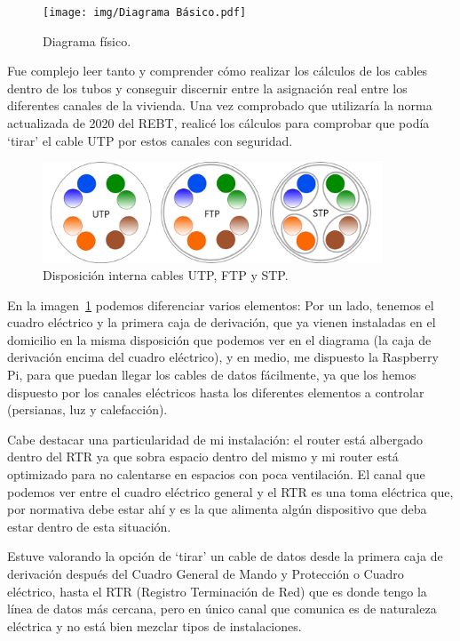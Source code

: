 \begin{figure}[h]
    \centering
    \texttt{[image: img/Diagrama Básico.pdf]}
    \caption{Diagrama físico. } \label{Img:diagramaBasico}
\end{figure}

Fue complejo leer tanto y comprender cómo realizar los cálculos de los cables dentro de los tubos y conseguir discernir entre la asignación real entre los diferentes canales de la vivienda. Una vez comprobado que utilizaría la norma actualizada de 2020 del REBT, realicé los cálculos para comprobar que podía `tirar' el cable UTP por estos canales con seguridad. 

\begin{figure}[h]
    \centering
    \includegraphics[width=0.9\textwidth]{img/CABLES.png}
    \caption{Disposición interna cables UTP, FTP y STP.} \label{Img:CablesDatos}
\end{figure}

En la imagen~\ref{Img:diagramaBasico} podemos diferenciar varios elementos: Por un lado, tenemos el cuadro eléctrico y la primera caja de derivación, que ya vienen instaladas en el domicilio en la misma disposición que podemos ver en el diagrama (la caja de derivación encima del cuadro eléctrico), y en medio, me dispuesto la Raspberry Pi, para que puedan llegar los cables de datos fácilmente, ya que los hemos dispuesto por los canales eléctricos hasta los diferentes elementos a controlar (persianas, luz y calefacción).

Cabe destacar una particularidad de mi instalación: el router está albergado dentro del RTR ya que sobra espacio dentro del mismo y mi router está optimizado para no calentarse en espacios con poca ventilación. El canal que podemos ver entre el cuadro eléctrico general y el RTR es una toma eléctrica que, por normativa debe estar ahí y es la que alimenta algún dispositivo que deba estar dentro de esta situación.

Estuve valorando la opción de ‘tirar’ un cable de datos desde la primera caja de derivación después del Cuadro General de Mando y Protección o Cuadro eléctrico, hasta el RTR (Registro Terminación de Red) que es donde tengo la línea de datos más cercana, pero en único canal que comunica es de naturaleza eléctrica y no está bien mezclar tipos de instalaciones.


